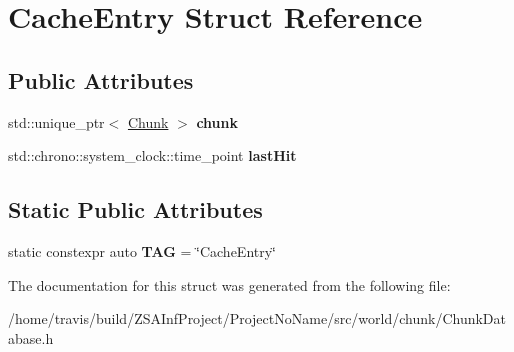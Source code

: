 \hypertarget{structCacheEntry}{\section{Cache\-Entry Struct Reference}
\label{structCacheEntry}
}
\subsection*{Public Attributes}
\begin{DoxyCompactItemize}
\item 
\hypertarget{structCacheEntry_aee492f9285bb4a0415414628bd484e5b}{std\-::unique\-\_\-ptr$<$ \hyperlink{classChunk}{Chunk} $>$ {\bfseries chunk}}\label{structCacheEntry_aee492f9285bb4a0415414628bd484e5b}

\item 
\hypertarget{structCacheEntry_a2f38d76a011b952a0d4d3acbbb88b747}{std\-::chrono\-::system\-\_\-clock\-::time\-\_\-point {\bfseries last\-Hit}}\label{structCacheEntry_a2f38d76a011b952a0d4d3acbbb88b747}

\end{DoxyCompactItemize}
\subsection*{Static Public Attributes}
\begin{DoxyCompactItemize}
\item 
\hypertarget{structCacheEntry_ae7717d7b51835ec7486641f72eef5e7e}{static constexpr auto {\bfseries T\-A\-G} = \char`\"{}Cache\-Entry\char`\"{}}\label{structCacheEntry_ae7717d7b51835ec7486641f72eef5e7e}

\end{DoxyCompactItemize}


The documentation for this struct was generated from the following file\-:\begin{DoxyCompactItemize}
\item 
/home/travis/build/\-Z\-S\-A\-Inf\-Project/\-Project\-No\-Name/src/world/chunk/Chunk\-Database.\-h\end{DoxyCompactItemize}
